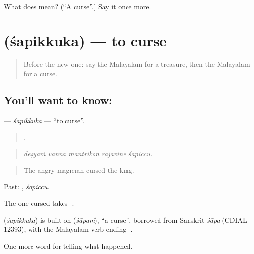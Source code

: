 \begin{tcolorbox}[breakable,colback=teal!4,colframe=teal!35!black,title={Before you move on}]
What does  mean? (\textquotedblleft{}A curse\textquotedblright{}.) Say it once more.
\end{tcolorbox}
\section[\texorpdfstring{\ml{ശപിക്കുക} (śapikkuka)}{ശപിക്കുക (śapikkuka)}]{ (śapikkuka) — to curse}

\label{lesson:ML-C403-sapikkuka}



\begin{quote}
Before the new one: say the Malayalam for a treasure, then the Malayalam for a curse.
\end{quote}

\subsection*{You'll want to know: }
\textbf{} — \emph{śapikkuka} — \textquotedblleft{}to curse\textquotedblright{}.

\begin{quote}
    .
\end{quote}

\begin{quote}
\emph{dēṣyaṁ vanna māntrikan rājāvine śapiccu.}
\end{quote}

\begin{quote}
The angry magician cursed the king.
\end{quote}

Past: , \emph{śapiccu}.

The one cursed takes -.

\begin{cousinweb}
\textbf{} (\emph{śapikkuka}) is built on  (\emph{śāpaṁ}), \textquotedblleft{}a curse\textquotedblright{}, borrowed from Sanskrit \emph{śāpa} (CDIAL 12393), with the Malayalam verb ending -.
\end{cousinweb}

\begin{grammarlens}[title={What you've built}]
One more word for telling what happened.
\end{grammarlens}

